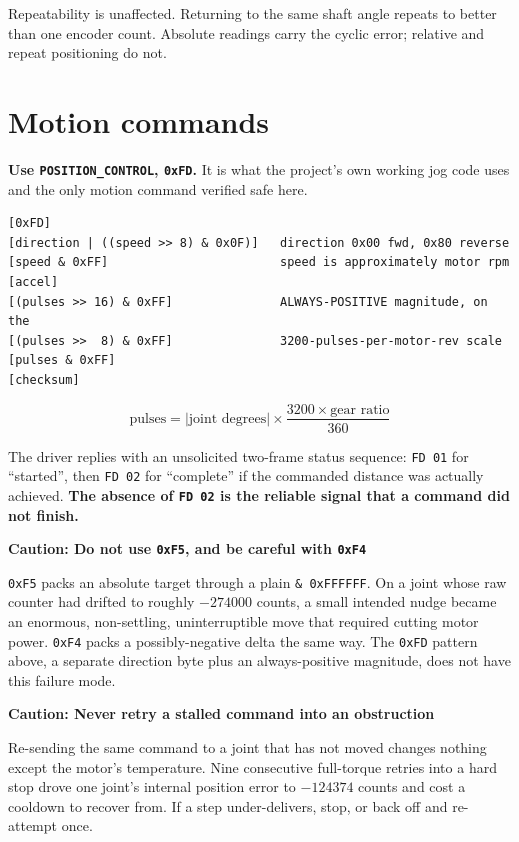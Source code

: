 \documentclass[11pt,letterpaper]{article}
\newenvironment{caution}[1]{%
    \par\addvspace{8pt}%
    \noindent{\color{cautionred}\rule{\linewidth}{0.8pt}}\par\vspace{2pt}
    \noindent\textbf{\color{cautionred}Caution: #1}\par\vspace{2pt}
}{%
    \par\vspace{2pt}\noindent{\color{cautionred}\rule{\linewidth}{0.4pt}}%
    \par\addvspace{8pt}%
}
\begin{document}
Repeatability is unaffected. Returning to the same shaft angle repeats to better
than one encoder count. Absolute readings carry the cyclic error; relative and
repeat positioning do not.

\section{Motion commands}
\label{sec:motion}

\textbf{Use \texttt{POSITION\_CONTROL}, \texttt{0xFD}.} It is what the project's own
working jog code uses and the only motion command verified safe here.

\begin{lstlisting}
[0xFD]
[direction | ((speed >> 8) & 0x0F)]   direction 0x00 fwd, 0x80 reverse
[speed & 0xFF]                        speed is approximately motor rpm
[accel]
[(pulses >> 16) & 0xFF]               ALWAYS-POSITIVE magnitude, on the
[(pulses >>  8) & 0xFF]               3200-pulses-per-motor-rev scale
[pulses & 0xFF]
[checksum]
\end{lstlisting}

\[
\text{pulses} = |\text{joint degrees}| \times \frac{3200 \times \text{gear ratio}}{360}
\]

The driver replies with an unsolicited two-frame status sequence: \texttt{FD 01} for
``started'', then \texttt{FD 02} for ``complete'' if the commanded distance was
actually achieved. \textbf{The absence of \texttt{FD 02} is the reliable signal that
a command did not finish.}

\begin{caution}{Do not use \texttt{0xF5}, and be careful with \texttt{0xF4}}
\texttt{0xF5} packs an absolute target through a plain \texttt{\& 0xFFFFFF}. On a
joint whose raw counter had drifted to roughly $-274000$ counts, a small intended
nudge became an enormous, non-settling, uninterruptible move that required cutting
motor power. \texttt{0xF4} packs a possibly-negative delta the same way. The
\texttt{0xFD} pattern above, a separate direction byte plus an always-positive
magnitude, does not have this failure mode.
\end{caution}

\begin{caution}{Never retry a stalled command into an obstruction}
Re-sending the same command to a joint that has not moved changes nothing except the
motor's temperature. Nine consecutive full-torque retries into a hard stop drove one
joint's internal position error to $-124374$ counts and cost a cooldown to recover
from. If a step under-delivers, stop, or back off and re-attempt once.
\end{caution}
\end{document}
